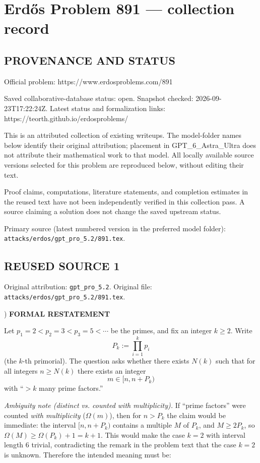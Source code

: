 \section*{Erd\H{o}s Problem 891 --- collection record}

\subsection*{PROVENANCE AND STATUS}
Official problem: https://www.erdosproblems.com/891

Saved collaborative-database status: open.
Snapshot checked: 2026-09-23T17:22:24Z.
Latest status and formalization links: https://teorth.github.io/erdosproblems/

This is an attributed collection of existing writeups. The model-folder names below identify their original attribution; placement in GPT\_6\_Astra\_Ultra does not attribute their mathematical work to that model. All locally available source versions selected for this problem are reproduced below, without editing their text.

Proof claims, computations, literature statements, and completion estimates in the reused text have not been independently verified in this collection pass. A source claiming a solution does not change the saved upstream status.

Primary source (latest numbered version in the preferred model folder): \texttt{attacks/erdos/gpt\_pro\_5.2/891.tex}.

\subsection*{REUSED SOURCE 1}
Original attribution: \texttt{gpt\_pro\_5.2}.
Original file: \texttt{attacks/erdos/gpt\_pro\_5.2/891.tex}.


) \textbf{FORMAL RESTATEMENT}

\noindent Let $p_1=2<p_2=3<p_3=5<\cdots$ be the primes, and fix an integer $k\ge 2$. Write
\[
P_k := \prod_{i=1}^k p_i
\]
(the $k$-th primorial). The question asks whether there exists $N(k)$ such that for all integers $n\ge N(k)$ there exists an integer
\[
 m\in [n,n+P_k)
\]
with ``$>k$ many prime factors.''

\noindent \emph{Ambiguity note (distinct vs. counted with multiplicity).}
If ``prime factors'' were counted \emph{with multiplicity} ($\Omega(m)$), then for $n>P_k$ the claim would be immediate: the interval $[n,n+P_k)$ contains a multiple $M$ of $P_k$, and $M\ge 2P_k$, so $\Omega(M)\ge \Omega(P_k)+1 = k+1$. This would make the case $k=2$ with interval length $6$ trivial, contradicting the remark in the problem text that the case $k=2$ is unknown. Therefore the intended meaning must be:

